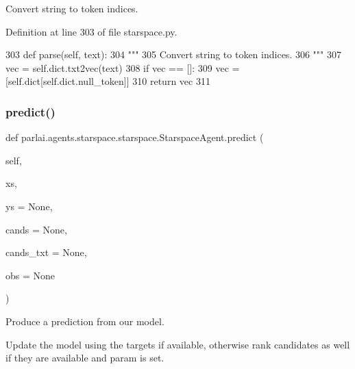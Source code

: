 \begin{DoxyVerb}Convert string to token indices.
\end{DoxyVerb}
 

Definition at line 303 of file starspace.\+py.


\begin{DoxyCode}
303     \textcolor{keyword}{def }parse(self, text):
304         \textcolor{stringliteral}{"""}
305 \textcolor{stringliteral}{        Convert string to token indices.}
306 \textcolor{stringliteral}{        """}
307         vec = self.dict.txt2vec(text)
308         \textcolor{keywordflow}{if} vec == []:
309             vec = [self.dict[self.dict.null\_token]]
310         \textcolor{keywordflow}{return} vec
311 
\end{DoxyCode}
\mbox{\label{classparlai_1_1agents_1_1starspace_1_1starspace_1_1StarspaceAgent_a16753fa083c07bcdb8164116d8288b39}} 
\subsubsection{\texorpdfstring{predict()}{predict()}}
{\footnotesize\ttfamily def parlai.\+agents.\+starspace.\+starspace.\+Starspace\+Agent.\+predict (\begin{DoxyParamCaption}\item[{}]{self,  }\item[{}]{xs,  }\item[{}]{ys = {\ttfamily None},  }\item[{}]{cands = {\ttfamily None},  }\item[{}]{cands\+\_\+txt = {\ttfamily None},  }\item[{}]{obs = {\ttfamily None} }\end{DoxyParamCaption})}

\begin{DoxyVerb}Produce a prediction from our model.

Update the model using the targets if available, otherwise rank candidates as
well if they are available and param is set.
\end{DoxyVerb}
 

